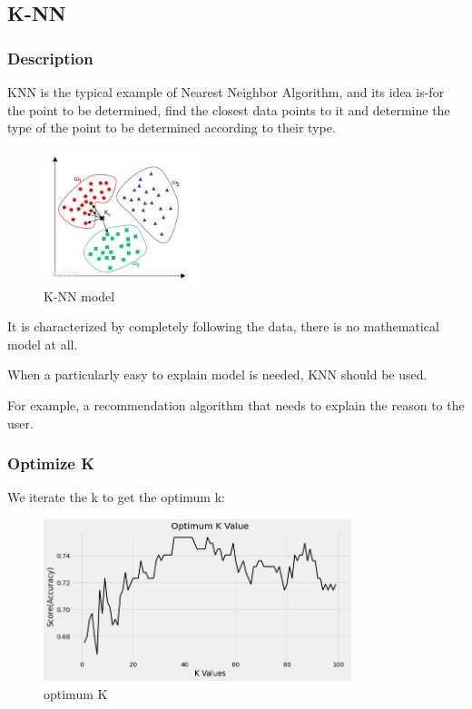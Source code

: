 \documentclass[11pt,en]{elegantpaper}
\begin{document}
\subsection{K-NN}
\subsubsection{Description}
 KNN is the typical example of Nearest Neighbor Algorithm, and its idea is-for the point to be determined, find the closest data points to it and determine the type of the point to be determined according to their type.

 \begin{figure}[H]
    \centering
    \includegraphics[width=0.4\textwidth]{figure/knn-model.jpg}
    \caption{K-NN model}
\end{figure}
It is characterized by completely following the data, there is no mathematical model at all.

When a particularly easy to explain model is needed, KNN should be used. 

For example, a recommendation algorithm that needs to explain the reason to the user.

\subsubsection{Optimize K}
We iterate the k to get the optimum k:
\begin{figure}[H]
    \centering
    \includegraphics[width=0.8\textwidth]{figure/opti-k.png}
    \caption{optimum K}
\end{figure}
\end{document}
